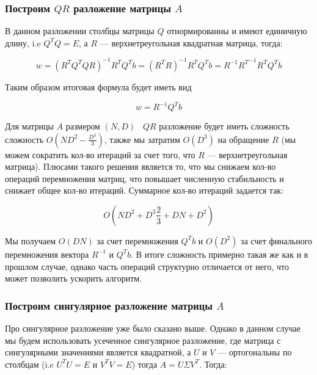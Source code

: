 \documentclass{article}
\begin{document}
    \subsubsection{Построим $QR$ разложение матрицы $A$}

    В данном разложении столбцы матрицы $Q$ отнормированны и имеют единичную длину, i.e $Q^{T}Q = E$, а $R$ --- верхнетреугольная квадратная матрица, тогда:

    \begin{equation}
        w = (R^{T}Q^{T}QR)^{-1} R^{T}Q^{T} b = (R^{T}R)^{-1} R^{T}Q^{T} b = R^{-1} {R^{T}}^{-1} R^{T}Q^{T} b
    \end{equation}

    Таким образом итоговая формула будет иметь вид

    \begin{equation}
        w = R^{-1} Q^{T} b
    \end{equation}

    Для матрицы $A$ размером $(N, D)$ \ $QR$ разложение будет иметь сложность сложность $O(ND^{2} - \frac{D^{3}}{3})$,
    также мы затратим $O(D^{3})$ на обращение $R$ (мы можем сократить кол-во итераций за счет того, что $R$ --- верхнетреугольная матрица).
    Плюсами такого решения является то, что мы снижаем кол-во операций перемножения матриц, что повышает численную стабильность
    и снижает общее кол-во итераций.
    Суммарное кол-во итераций задается так:

    \begin{equation}
        O(ND^{2} + D^{3}  \frac{2}{3} + DN + D^{2})
    \end{equation}

    Мы получаем $O(DN)$ за счет перемножения $Q^{T} b$ и $O(D^{2})$ за счет финального перемножения вектора $R^{-1}$ и $Q^{T} b$.
    В итоге сложность примерно такая же как и в прошлом случае, однако часть операций структурно отличается от него, что может позволить ускорить
    алгоритм.


    \subsubsection{Построим сингулярное разложение матрицы $A$}


    Про сингулярное разложение уже было сказано выше.
    Однако в данном случае мы будем использовать усеченное сингулярное разложение, где матрица с сингулярными значениями
    является квадратной, а $U$ и $V$ --- ортогональны по столбцам (i.e $U^{T}U = E$ и $V^{T}V = E$) тогда $A = U \Sigma V^{T} $.
    Тогда:
\end{document}
